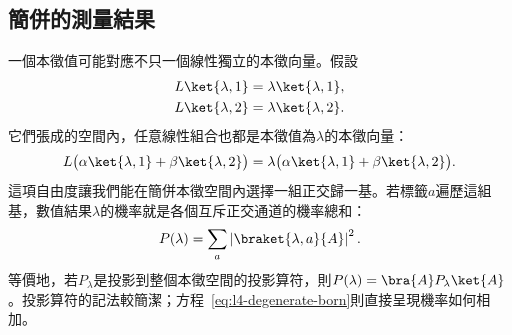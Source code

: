 \begin{classroomqa}
\end{classroomqa}

\begin{classroomqa}
\end{classroomqa}

\begin{classroomqa}
\end{classroomqa}

\subsection{簡併的測量結果}

一個本徵值可能對應不只一個線性獨立的本徵向量。假設
\begin{align}
L\ket{\lambda,1}&=\lambda\ket{\lambda,1},\\
L\ket{\lambda,2}&=\lambda\ket{\lambda,2}.
\end{align}
它們張成的空間內，任意線性組合也都是本徵值為\(\lambda\)的本徵向量：
\begin{equation}
L\bigl(\alpha\ket{\lambda,1}+\beta\ket{\lambda,2}\bigr)
=
\lambda\bigl(\alpha\ket{\lambda,1}+\beta\ket{\lambda,2}\bigr).
\end{equation}
這項自由度讓我們能在簡併本徵空間內選擇一組正交歸一基。若標籤\(a\)遍歷這組基，數值結果\(\lambda\)的機率就是各個互斥正交通道的機率總和：
\begin{equation}
P(\lambda)=\sum_a\left|\braket{\lambda,a}{A}\right|^2.
\label{eq:l4-degenerate-born}
\end{equation}
等價地，若\(P_\lambda\)是投影到整個本徵空間的投影算符，則\(P(\lambda)=\bra{A}P_\lambda\ket{A}\)。投影算符的記法較簡潔；方程~\eqref{eq:l4-degenerate-born}則直接呈現機率如何相加。

